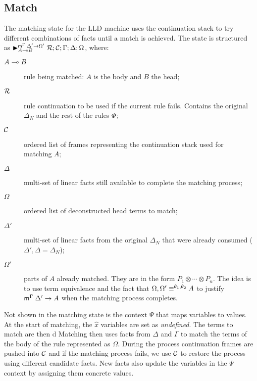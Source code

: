 \subsection{Match}\label{sec:lld_body_match}

The matching state for the LLD machine uses the continuation stack to try
different combinations of facts until a match is achieved.  The state is
structured as $\matstate{A \lolli
   B}{\rulestk}{\lstack{C}}{\Gamma}{\Delta}{\Omega}{\Delta' \rightarrow
      \Omega'}$, where:

\begin{description}
   \item[$A \lolli B$] rule being matched: $A$ is the body and $B$ the head;

   \item[$\rulestk$] rule continuation to be used if the current rule fails.
   Contains the original $\Delta_N$ and the rest of the rules $\Phi$;

   \item[$\lstack{C}$] ordered list of frames representing the continuation
   stack used for matching $A$;

   \item[$\Delta$] multi-set of linear facts still available to complete the
   matching process;

   \item[$\Omega$] ordered list of deconstructed head terms to match;

   \item[$\Delta'$] multi-set of linear facts from the original $\Delta_N$ that
   were already consumed ($\Delta', \Delta = \Delta_N$);

   \item[$\Omega'$] parts of $A$ already matched. They are in the form $P_1
   \otimes \dotsb \otimes P_n$. The idea is to use term equivalence and the fact
   that $\feq{\Omega, \Omega'}{A}$ to justify $\mz{\Gamma}{\Delta'}{A}$ when the
   matching process completes.

\end{description}

Not shown in the matching state is the context $\Psi$ that maps variables to
values. At the start of matching, the $\widehat{x}$ variables are set as
\emph{undefined}. The terms to match are then d
Matching then uses facts from $\Delta$ and $\Gamma$ to match the terms
of the body of the rule represented as $\Omega$. During the process
continuation frames are pushed into $\lstack{C}$ and if the matching process
fails, we use $\lstack{C}$ to restore the process using different
candidate facts. New facts also update the variables in the $\Psi$ context by
assigning them concrete values.

